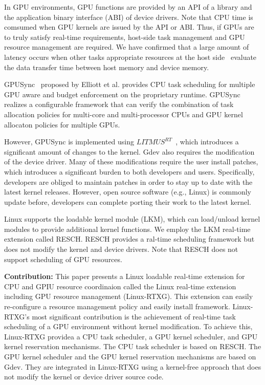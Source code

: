 In GPU environments,
GPU functions are provided by an API of a library and the application binary interface (ABI) of device drivers.
Note that CPU time is comsumed when GPU kernels are issued by the API or ABI.
Thus, if GPUs are to truly satisfy real-time requirements,
host-side task management and GPU resource management are required.
We have confirmed that a large amount of latency occurs
when other tasks appropriate resources at the host side~\cite{fujii:icpads2013} evaluate the data transfer time between host memory and device memory.

GPUSync~\cite{elliott:gpusync13,elliott:explor14} proposed by Elliott et al. provides CPU task scheduling for multiple GPU aware and budget enforcement on the proprietary runtime.
GPUSync realizes a configurable framework that can verify the combination of task allocation policies for multi-core and multi-processor CPUs and GPU kernel allocaton policies for multiple GPUs.

However, GPUSync is implemented using $LITMUS^{RT}$~\cite{litmus}, which introduces a significant amount of changes to the kernel.
Gdev also requires the modification of the device driver.
Many of these modifications require the user install patches, which introduces a significant burden to both developers and users.
Specifically, developers are obliged to maintain patches in order to stay up to date with the latest kernel releases.
However, open source software (e.g., Linux) is commonly update before, developers can complete porting their work to the latest kernel.

Linux supports the loadable kernel module (LKM), which can load/unload kernel modules to provide additional kernel functions.
We employ the LKM real-time extension called RESCH\cite{kato:loadable}.
RESCH provides a ral-time scheduling framework but does not modify the kernel and device drivers.
Note that RESCH does not support scheduling of GPU resources.

\textbf{Contribution:}
This paper presents a Linux loadable real-time extension for CPU and GPIU resource coordinaion
called the Linux real-time extension including GPU resource management (Linux-RTXG).
This extension can easily re-configure a resource management policy and easily install framework.
Linux-RTXG's most significant contribution is the achievement of real-time task scheduling of a GPU environment without kernel modification.
To achieve this, 
Linux-RTXG providea a CPU task scheduler, a GPU kernel scheduler, and GPU kernel reservation mechanisms.
The CPU task scheduler is based on RESCH.
The GPU kernel scheduler and the GPU kernel reservation mechanisms are based on Gdev.
They are integrated in Linux-RTXG using a kernel-free approach that does not modify the  kernel or device driver source code.


